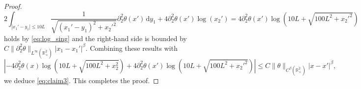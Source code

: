 \documentclass[10pt]{amsart}
\theoremstyle{definition}
\theoremstyle{remark}
\numberwithin{equation}{section}
\newcommand{\ud}{\mathrm{d}}
\newcommand{\rd}{\partial}
\newcommand{\0}{\emptyset}
\newcommand{\ohp}{\overline{\bbR^2_+}}
\newcommand{\tht}{\theta}
\newcommand{\bbR}{\mathbb R}
\begin{document}
\begin{proof}
\begin{equation*}
			2 \int_{|x_1'-y_1| \le 10L } \frac{1}{ \sqrt{ (x_1'-y_1)^2 + x_2'^2 }  } \rd_{2}^2 \tht(x') \, \ud y_1 + 4 \rd_{2}^2 \tht(x') \log (x_2') = 4 \rd_{2}^2 \tht(x') \log (10L + \sqrt{100L^2 + x_2'^2})
		\end{equation*}
		holds by \eqref{eq:log_sing} and
		the right-hand side is bounded by $C\| \rd_{2}^2 \tht \|_{L^{\infty}(\ohp)}|x_1-x_1'|^{\beta}$. Combining these results with \begin{equation*}
			\left| -4 \rd_{2}^2 \tht(x) \log (10L + \sqrt{100L^2 + x_2^2}) + 4 \rd_{2}^2 \tht(x') \log (10L + \sqrt{100L^2 + x_2'^2}) \right| \leq C \| \tht \|_{C^{\beta}(\ohp)} |x-x'|^{\beta},
		\end{equation*} we deduce \eqref{eq:claim3}. This completes the proof.
	\end{proof}
	
	
	
\end{document}
